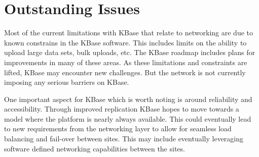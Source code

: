 \documentclass[10pt,a4paper]{report}
\begin{document}
\section{Outstanding Issues}

Most of the current limitations with KBase that relate to networking are due to known constrains in the KBase software.  This includes limits on the ability to upload large data sets, bulk uploads, etc.   The KBase roadmap includes plans for improvements in many of these areas.  
As these limitations and constraints are lifted, KBase may encounter new challenges.  But the network is not currently imposing any serious barriers on KBase.

One important aspect for KBase which is worth noting is around reliability and accessibility.  Through improved replication KBase hopes to move towards a model where the platform is nearly always available.  This could eventually lead to new requirements from the networking layer to allow for seamless load balancing and fail-over between sites.  This may include eventually leveraging software defined networking capabilities between the sites.
\end{document}

